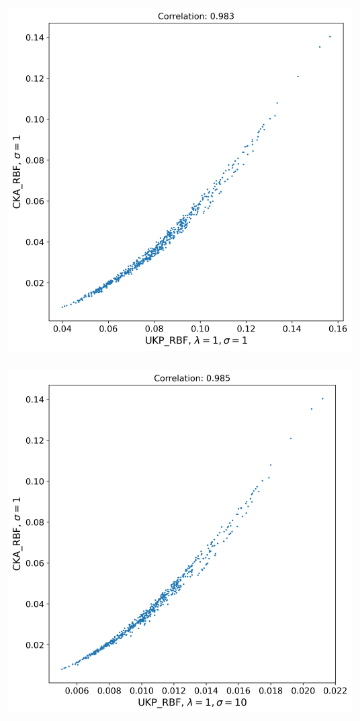 \documentclass{article}
\theoremstyle{plain}
\begin{document}
\begin{figure}[h!]
    \centering
    \begin{subfigure}[b]{0.45\textwidth}
        \includegraphics[width=\textwidth]{Appendix figures/imagenet_experiments/Correlation final/Correlation plot for CKA_dist_RBF_1.000000e+00 and UKP_dist_RBF_1.000000e+00_1.000000e+00.png}
    \end{subfigure}
    \hfill
    \begin{subfigure}[b]{0.45\textwidth}
        \includegraphics[width=\textwidth]{Appendix figures/imagenet_experiments/Correlation final/Correlation plot for CKA_dist_RBF_1.000000e+00 and UKP_dist_RBF_1.000000e+00_1.000000e+01.png}
    \end{subfigure}
    

\end{figure}
\end{document}

